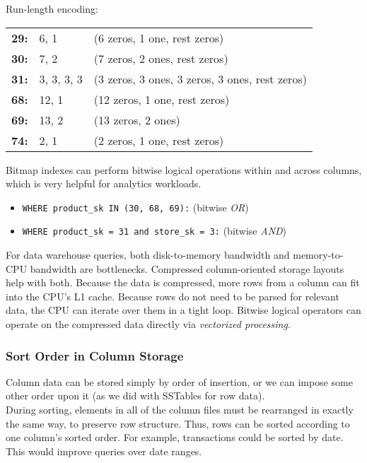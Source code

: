 \documentclass[12pt, titlepage]{article}
\begin{document}
Run-length encoding: \\[-7mm]
\begin{table}[H]
    \begin{tabular}{p{1cm}p{2cm}p{8cm}}
        \textbf{29:} & 6, 1 & (6 zeros, 1 one, rest zeros) \\
        \textbf{30:} & 7, 2 & (7 zeros, 2 ones, rest zeros) \\
        \textbf{31:} & 3, 3, 3, 3 & (3 zeros, 3 ones, 3 zeros, 3 ones, rest zeros) \\
        \textbf{68:} & 12, 1 & (12 zeros, 1 one, rest zeros) \\
        \textbf{69:} & 13, 2 & (13 zeros, 2 ones) \\
        \textbf{74:} & 2, 1 & (2 zeros, 1 one, rest zeros)
    \end{tabular}
\end{table}

Bitmap indexes can perform bitwise logical operations within and across columns, which is very helpful for analytics workloads.

\begin{itemize}
    \item \texttt{WHERE product\_sk IN (30, 68, 69):} (bitwise \textit{OR})
    \item \texttt{WHERE product\_sk = 31 and store\_sk = 3:} (bitwise \textit{AND})
\end{itemize}

For data warehouse queries, both disk-to-memory bandwidth and memory-to-CPU bandwidth are bottlenecks. Compressed column-oriented storage layouts help with both. Because the data is compressed, more rows from a column can fit into the CPU's L1 cache. Because rows do not need to be parsed for relevant data, the CPU can iterate over them in a tight loop. Bitwise logical operators can operate on the compressed data directly via \textit{vectorized processing}.

\subsubsection{Sort Order in Column Storage}

Column data can be stored simply by order of insertion, or we can impose some other order upon it (as we did with SSTables for row data). \\

During sorting, elements in all of the column files must be rearranged in exactly the same way, to preserve row structure. Thus, rows can be sorted according to one column's sorted order. For example, transactions could be sorted by date. This would improve queries over date ranges. \\
\end{document}
